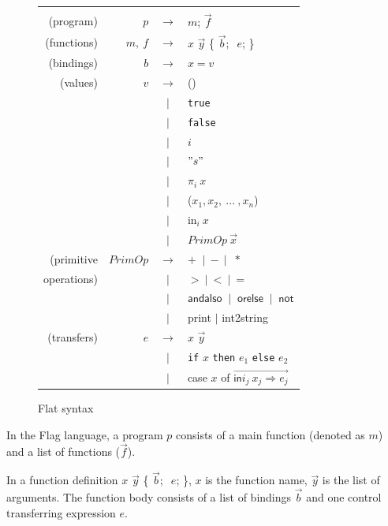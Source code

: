 \documentclass{article}
\theoremstyle{definition}
\theoremstyle{remark}
\numberwithin{equation}{section}
\begin{document}
\begin{figure}[!ht]
  \centering
\begin{tabular}{rrcl}
       &     &  &\\
(program) & $p$ & $\to$ & $m$; $\vec{f}$ \\

(functions) & $m,\ f$ & $\to$ & $x$ $\vec{y}$ \{
      $\vec{b};$  $\ e$; \}\\

(bindings) & $b$ & $\to$ & $x=v$ \\

(values) & $v$ & $\to$ & () \\
        &     & $|$ & \texttt{true}\\
        &     & $|$ & \texttt{false}\\
        &     & $|$ & $i$\\
        &     & $|$ & $"s"$\\
        &     & $|$ & $\pi _i\ x$\\
        &     & $|$ & ($x_1,x_2,\ ...\ , x_n$)\\
        &     & $|$ & \textsf{in}$_i\ x$\\
        &     & $|$ &  $PrimOp\ \vec{x}$\\

(primitive & $PrimOp$ & $\to$ & $+\ $ $|\ -\ |$ $\ *$\\
operations) &     & $|$ & $>\ |\ <\ |\ =$\\
        &     & $|$ & $\textsf{andalso }\ |\ \textsf{ orelse }\ |\ \textsf{ not}$\\
        &     & $|$ & \textsf{print} $|$ \textsf{int2string}\\

(transfers) & $e$ & $\to$ & $x$ $\vec{y}$\\
        &     & $|$ & \texttt{if} $x$ \texttt{then} $e_1$ \texttt{else} $e_2$\\
        &     & $|$ & \textsf{case} $x$ \textsf{of}
         $\overrightarrow{\textsf{in}i_j\ x_j \Rightarrow e_j}$\\
\end{tabular}
  \caption{Flat syntax}
  \label{fig-sub}
\end{figure}

In the Flag language, a program $p$ consists of a main function
(denoted as $m$) and a list of functions ($\vec{f}$).

In a function definition $x$ $\vec{y}$ \{ $\vec{b};$  $\ e$; \},
$x$ is the function name, $\vec{y}$ is the list of arguments.
 The function body consists of a list of
 bindings $\vec{b}$ and one control transferring expression $e$.
\end{document}
